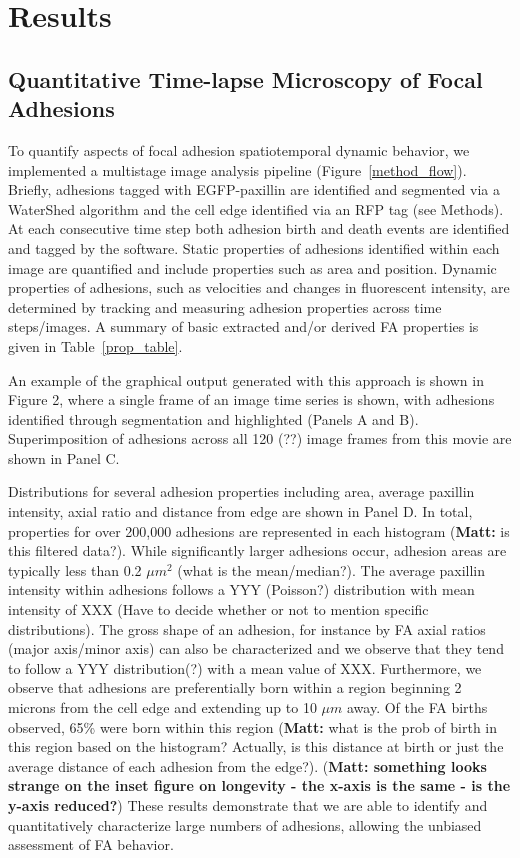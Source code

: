 \documentclass[10pt]{article}
\begin{document}
\section*{Results}


\subsection*{Quantitative Time-lapse Microscopy of Focal Adhesions}

To quantify aspects of focal adhesion spatiotemporal dynamic behavior, we
implemented a multistage image analysis pipeline (Figure~\ref{method_flow}).
Briefly, adhesions tagged with EGFP-paxillin are identified and segmented via a
WaterShed algorithm and the cell edge identified via an RFP tag (see Methods).
At each consecutive time step both adhesion birth and death events are
identified and tagged by the software. Static properties of adhesions identified
within each image are quantified and include properties such as area and
position. Dynamic properties of adhesions, such as velocities and changes in
fluorescent intensity, are determined by tracking and measuring adhesion
properties across time steps/images. A summary of basic extracted and/or derived
FA properties is given in Table~\ref{prop_table}.

An example of the graphical output generated with this approach is shown in
Figure 2, where a single frame of an image time series is shown, with adhesions
identified through segmentation and highlighted (Panels A and B).
Superimposition of adhesions across all 120 (??) image frames from this movie
are shown in Panel C.     

Distributions for several adhesion properties including area, average paxillin
intensity, axial ratio and distance from edge are shown in Panel D. In total,
properties for over 200,000 adhesions are represented in each histogram
(\textbf{Matt:} is this filtered data?). While significantly larger adhesions
occur, adhesion areas are typically less than 0.2 $\mu m^2$ (what is the
mean/median?). The average paxillin intensity within adhesions follows a YYY
(Poisson?) distribution with mean intensity of XXX (Have to decide whether or not to mention specific distributions). The gross shape of an adhesion, for instance by FA axial ratios
(major axis/minor axis) can also be characterized and we observe that they tend
to follow a YYY distribution(?) with a mean value of XXX. Furthermore, we
observe that adhesions are preferentially born within a region beginning 2
microns from the cell edge and extending up to 10 $\mu m$ away. Of the FA births
observed, 65\% were born within this region (\textbf{Matt:} what is the prob of
birth in this region based on the histogram? Actually, is this distance at birth
or just the average distance of each adhesion from the edge?). (\textbf{Matt:
something looks strange on the inset figure on longevity - the x-axis is the
same - is the y-axis reduced?}) These results demonstrate that we
are able to identify and quantitatively characterize large numbers of adhesions,
allowing the unbiased assessment of FA behavior.
\end{document}
